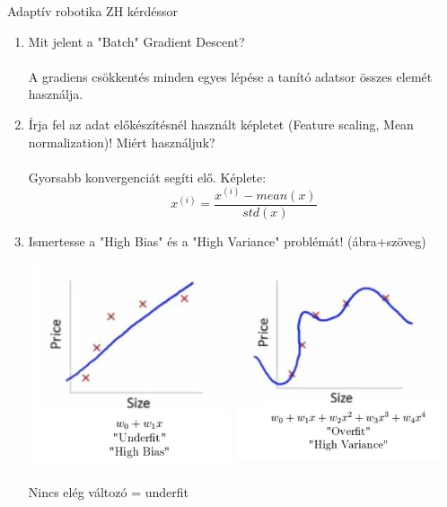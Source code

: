 \documentclass[12pt]{article}
\begin{document}
\begin{center}
\Large Adaptív robotika ZH kérdéssor
\end{center}

\begin{enumerate}
\item Mit jelent a "Batch" Gradient Descent?\\
\\
A gradiens csökkentés minden egyes lépése a tanító adatsor összes elemét használja.
\item Írja fel az adat előkészítésnél használt képletet (Feature scaling, Mean normalization)! Miért használjuk?\\
\\
Gyorsabb konvergenciát segíti elő. Képlete:
\begin{equation}
x^{(i)}=\frac{x^{(i)}-mean(x)}{std(x)}
\end{equation}
\item Ismertesse a "High Bias" és a "High Variance" problémát! (ábra+szöveg)\\
\begin{center}
\includegraphics[width=6cm,height=6cm,keepaspectratio]{./pics/HighBias.jpg}
\includegraphics[width=6cm,height=6cm,keepaspectratio]{./pics/HighVariance.jpg}
\end{center}
Nincs elég változó = underfit\\

\end{enumerate}
\end{document}
